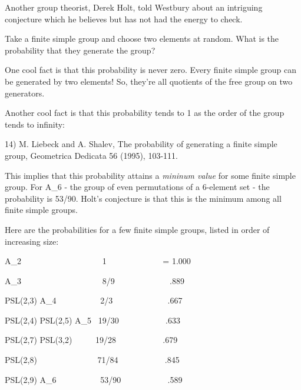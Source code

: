 Another group theorist, Derek Holt, told Westbury about an intriguing
conjecture which he believes but has not had the energy to check.

Take a finite simple group and choose two elements at random.  What 
is the probability that they generate the group?  

One cool fact is that this probability is never zero.  Every finite
simple group can be generated by two elements!  So, they're all
quotients of the free group on two generators.

Another cool fact is that this probability tends to 1 as the order of
the group tends to infinity:

14) M. Liebeck and A. Shalev, The probability of generating a finite 
simple group, Geometrica Dedicata 56 (1995), 103-111.

This implies that this probability attains a \emph{mininum value} for
some finite simple group.  For A_{6} - the group of even
permutations of a 6-element set - the probability is 53/90.  Holt's
conjecture is that this is the minimum among all finite simple groups.

Here are the probabilities for a few finite simple groups, listed
in order of increasing size:

A_{2}   \   \   \   \   \  
\   \   \   \   \  \   \   \   \   
\   \   \   \   \                          1     
\   \   \   \   \   \   \  \  
\  \   \  \   \                         = 1.000

A_{3}  \   \   \   \   \  
\   \   \   \   \  \   \   \   \   \  
\   \   \   \   
8/9   
\   \   \   \  \   \  \   \  
\   \  \  
           ~ .889

PSL(2,3) \cong  A_{4}              
\   \   \   \   \  
\   \   \   \   \  
  2/3    
\   
\   \   \   \   \   \   \   \    \    
\    
   ~ .667

PSL(2,4) \cong  PSL(2,5) \cong  A_{5}  \    
19/30
\   \   \   \     \   \   \     \     \    
~ .633

PSL(2,7) \cong  PSL(3,2)         \   \   \   \   \     
19/28
\   \                 \   \                 
\   \   \   \   \  
~ .679

PSL(2,8)   \   \   \   \   \   
\   \   \   \   \   \   \   
\   \                                71/84
\   \   \  \   \       
\   \   \   \   
 ~ .845

PSL(2,9) \cong  A_{6}      
\   \   \   \   \   \   \   \   \   
\             
53/90
\   \   \   \   \    \   \   \   \   
~ .589

